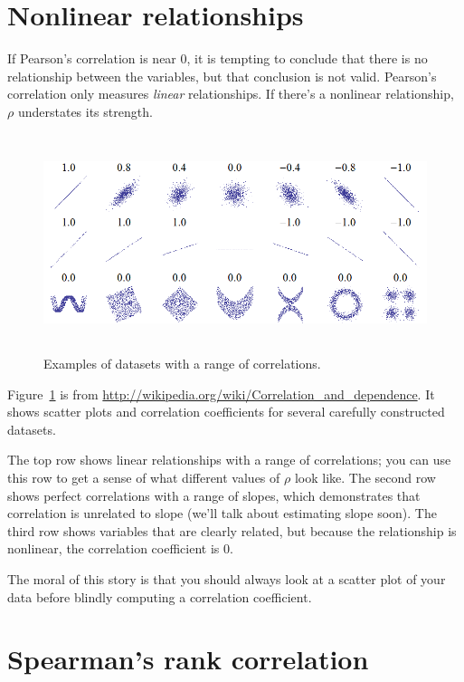 \documentclass[12pt]{book}
\begin{document}
\section{Nonlinear relationships}

If Pearson's correlation is near 0, it is tempting to conclude
that there is no relationship between the variables, but that
conclusion is not valid.  Pearson's correlation only measures {\em
  linear\/} relationships.  If there's a nonlinear relationship, $\rho$
understates its strength.  

\begin{figure}
\centerline{\includegraphics[height=2.5in]{figs/Correlation_examples.png}}
\caption{Examples of datasets with a range of correlations.}
\label{corr_examples}
\end{figure}

Figure~\ref{corr_examples} is from
\url{http://wikipedia.org/wiki/Correlation_and_dependence}.  It shows
scatter plots and correlation coefficients for several
carefully constructed datasets.

The top row shows linear relationships with a range of correlations;
you can use this row to get a sense of what different values of
$\rho$ look like.  The second row shows perfect correlations with a
range of slopes, which demonstrates that correlation is unrelated to
slope (we'll talk about estimating slope soon).  The third row shows
variables that are clearly related, but because the relationship is
nonlinear, the correlation coefficient is 0.

The moral of this story is that you should always look at a scatter
plot of your data before blindly computing a correlation coefficient.


\section{Spearman's rank correlation}
\end{document}

